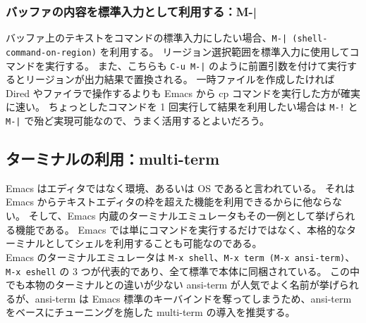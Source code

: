 \subsubsection{バッファの内容を標準入力として利用する：M-|}
バッファ上のテキストをコマンドの標準入力にしたい場合、\texttt{M-| (shell-command-on-region)} を利用する。
リージョン選択範囲を標準入力に使用してコマンドを実行する。
また、こちらも \texttt{C-u M-|} のように前置引数を付けて実行するとリージョンが出力結果で置換される。
一時ファイルを作成したければ Dired やファイラで操作するよりも Emacs から cp コマンドを実行した方が確実に速い。
ちょっとしたコマンドを 1 回実行して結果を利用したい場合は \texttt{M-!} と \texttt{M-|} で殆ど実現可能なので、うまく活用するとよいだろう。
\subsection{ターミナルの利用：multi-term}
Emacs はエディタではなく環境、あるいは OS であると言われている。
それは Emacs からテキストエディタの枠を超えた機能を利用できるからに他ならない。
そして、Emacs 内蔵のターミナルエミュレータもその一例として挙げられる機能である。
Emacs では単にコマンドを実行するだけではなく、本格的なターミナルとしてシェルを利用することも可能なのである。\\

Emacs のターミナルエミュレータは \texttt{M-x shell}、\texttt{M-x term (M-x ansi-term)}、\texttt{M-x eshell} の 3 つが代表的であり、全て標準で本体に同梱されている。
この中でも本物のターミナルとの違いが少ない ansi-term が人気でよく名前が挙げられるが、ansi-term は Emacs 標準のキーバインドを奪ってしまうため、ansi-term をベースにチューニングを施した multi-term の導入を推奨する。
